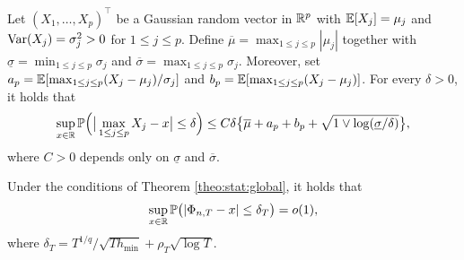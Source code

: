 \begin{propA}{\cite{KhismatullinaVogt2020}}\label{theoA:anticon}
Let $(X_1,\ldots,X_p)^\top$ be a Gaussian random vector in $\mathbb{R}^p$ with $\mathbb{E}[X_j] = \mu_j$ and $\textnormal{Var}(X_j) = \sigma_j^2 > 0$ for $1 \le j \le p$. Define $\overline{\mu} = \max_{1 \le j \le p} |\mu_j|$ together with $\underline{\sigma} = \min_{1 \le j \le p} \sigma_j$ and $\overline{\sigma} = \max_{1 \le j \le p} \sigma_j$. Moreover, set $a_p = \mathbb{E}[ \max_{1 \le j \le p} (X_j-\mu_j)/\sigma_j ]$ and $b_p = \mathbb{E}[ \max_{1 \le j \le p} (X_j-\mu_j) ]$. For every $\delta > 0$, it holds that
\[ \sup_{x \in \mathbb{R}} \mathbb{P} \Big( \big| \max_{1 \le j \le p} X_j - x \big| \le \delta \Big) \le C \delta \big\{ \overline{\mu} + a_p + b_p + \sqrt{1 \vee \log(\underline{\sigma}/\delta)} \big\}, \]
where $C > 0$ depends only on $\underline{\sigma}$ and $\overline{\sigma}$. 
\end{propA} 
\begin{propA}\label{propA:anticon}
Under the conditions of Theorem \ref{theo:stat:global}, it holds that 
\begin{align}\label{eqA:anticon} \sup_{x \in \mathbb{R}} \mathbb{P} \big( | \Phi_{n,T} - x | \le \delta_T \big) = o(1),
\end{align}
where $\delta_T = T^{1/q} / \sqrt{T h_{\min}} + \rho_T \sqrt{\log T}$.
\end{propA}

